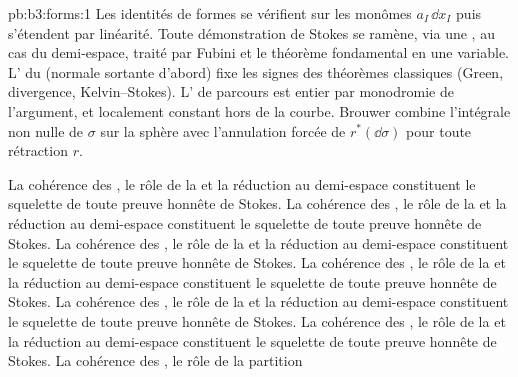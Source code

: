 \begin{solution}{pb:b3:forms:1}
Les identités de formes se vérifient sur les monômes $a_I\,\dd x_I$
puis s'étendent par linéarité. Toute démonstration de Stokes
se ramène, via une , au cas du demi-espace,
traité par Fubini et le théorème fondamental en une variable.
L' du  (normale sortante d'abord) fixe les signes
des théorèmes classiques (Green, divergence, Kelvin--Stokes).
L' de parcours est entier par monodromie de l'argument,
et localement constant hors de la courbe. Brouwer combine
l'intégrale non nulle de $\sigma$ sur la sphère avec l'annulation
forcée de $r^*(\dd\sigma)$ pour toute rétraction $r$.


La cohérence des , le rôle de la  et la réduction au demi-espace constituent le squelette de toute preuve honnête de Stokes. 
La cohérence des , le rôle de la  et la réduction au demi-espace constituent le squelette de toute preuve honnête de Stokes. 
La cohérence des , le rôle de la  et la réduction au demi-espace constituent le squelette de toute preuve honnête de Stokes. 
La cohérence des , le rôle de la  et la réduction au demi-espace constituent le squelette de toute preuve honnête de Stokes. 
La cohérence des , le rôle de la  et la réduction au demi-espace constituent le squelette de toute preuve honnête de Stokes. 
La cohérence des , le rôle de la  et la réduction au demi-espace constituent le squelette de toute preuve honnête de Stokes. 
La cohérence des , le rôle de la partition 
\end{solution}
